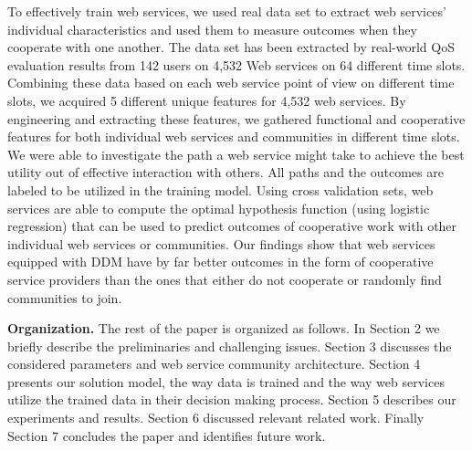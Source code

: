 \documentclass[10pt,journal,cspaper,compsoc]{IEEEtran}
\begin{document}
To effectively train web services, we used real data set to extract web services' individual characteristics and used them to measure outcomes when they cooperate with one another. The data set has been extracted by real-world QoS evaluation results from 142 users on 4,532 Web services on 64 different time slots. Combining these data based on each web service point of view on different time slots, we acquired 5 different unique features for 4,532 web services. By engineering and extracting these features, we gathered functional and cooperative features for both individual web services and communities in different time slots. We were able to investigate the path a web service might take to achieve the best utility out of effective interaction with others. All paths and the outcomes are labeled to be utilized in the training model. Using cross validation sets, web services are able to compute the optimal hypothesis function (using logistic regression) that can be used to predict outcomes of cooperative work with other individual web services or communities. Our findings show that web services equipped with DDM have by far better outcomes in the form of cooperative service providers than the ones that either do not cooperate or randomly find communities to join. 

\textbf{Organization.} The rest of the paper is organized as follows. In Section 2 we briefly describe the preliminaries and challenging issues. Section 3 discusses the considered parameters and web service community architecture. Section 4 presents our solution model, the way data is trained and the way web services utilize the trained data in their decision making process. Section 5 describes our experiments and results. Section 6 discussed relevant related work. Finally Section 7 concludes the paper and identifies future work.


\end{document}

